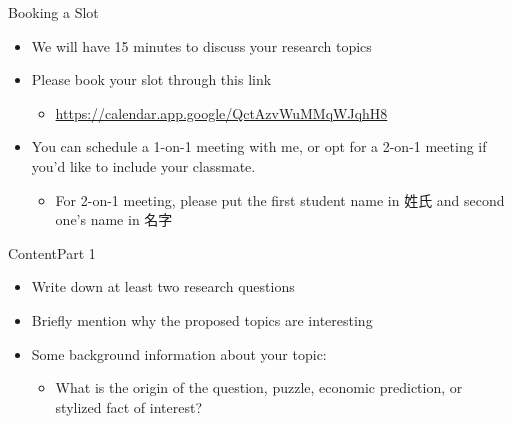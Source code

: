 \documentclass[dvipsnames,hyperref={pdfpagelabels=false}]{beamer}
\begin{document}
\begin{frame}{Booking a Slot}
	\begin{itemize} 
	
		\item We will have 15 minutes to discuss your research topics
		\vspace{0.2cm}
		\item Please book your slot through this link
		\vspace{0.2cm}
		\begin{itemize} 
			\item \url{https://calendar.app.google/QctAzvWuMMqWJqhH8}
			
		\end{itemize}
		\vspace{0.2cm}
		\item You can schedule a 1-on-1 meeting with me, or opt for a 2-on-1 meeting if you'd like to include your classmate. 
	\vspace{0.2cm}
	\begin{itemize} 
		\item For 2-on-1 meeting, please put the first student name in 姓氏 and second one's name in 名字
		
	\end{itemize}
		\vspace{0.2cm}
			
		
	\end{itemize}
\end{frame}







\begin{frame}{Content}{Part 1}
	\begin{itemize} 
		\item Write down at least two research questions
		\vspace{0.2cm}
		\item Briefly mention why the proposed topics are interesting 
		\vspace{0.2cm}
		\item Some background information about your topic: 
		\vspace{0.2cm}
		\begin{itemize}
			\item What is the origin of the question, puzzle, economic prediction, or stylized fact of interest?
		\end{itemize}
		
		
		
		
	\end{itemize}
\end{frame}
\end{document}
